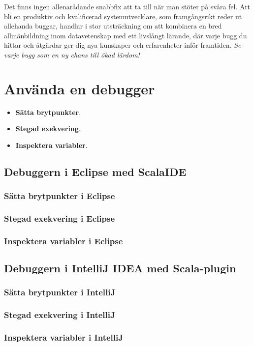 Det finns ingen allenarådande snabbfix att ta till när man stöter på svåra fel. Att bli en produktiv och kvalificerad systemutvecklare, som framgångsrikt reder ut allehanda buggar, handlar i stor utsträckning om att kombinera en bred allmänbildning inom datavetenskap med ett livslångt lärande, där varje bugg du hittar och åtgärdar ger dig nya kunskaper och erfarenheter inför framtiden.
\emph{Se varje bugg som en ny chans till ökad lärdom!}



\section{Använda en debugger}\label{section:debugging}

\begin{itemize}
\item \textbf{Sätta brytpunkter}.
\item \textbf{Stegad exekvering}.
\item \textbf{Inspektera variabler}.
\end{itemize}

\subsection{Debuggern i Eclipse med ScalaIDE}
\subsubsection{Sätta brytpunkter i Eclipse}\TODO
\subsubsection{Stegad exekvering i Eclipse}\TODO
\subsubsection{Inspektera variabler i Eclipse}\TODO

\subsection{Debuggern i IntelliJ IDEA med Scala-plugin}
\subsubsection{Sätta brytpunkter i IntelliJ}\TODO
\subsubsection{Stegad exekvering i IntelliJ}\TODO
\subsubsection{Inspektera variabler i IntelliJ}\TODO